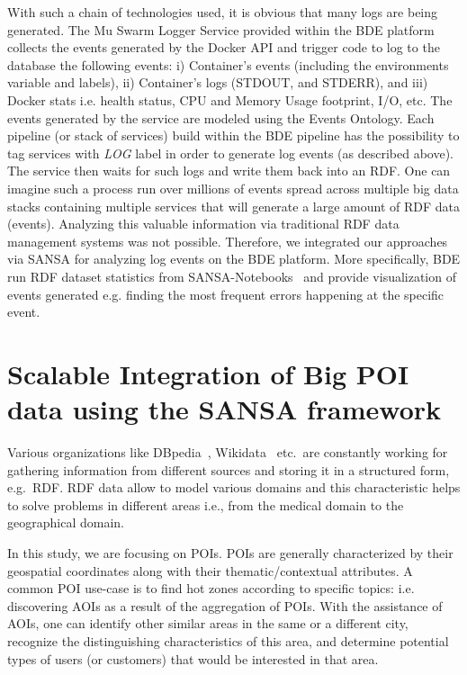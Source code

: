 With such a chain of technologies used, it is obvious that many logs are being generated.
The Mu Swarm Logger Service provided within the BDE platform collects the events generated by the Docker \gls{API} and trigger code to log to the database the following events: i) Container's events (including the environments variable and labels), ii) Container's logs (STDOUT, and STDERR), and iii) Docker stats i.e. health status, CPU and Memory Usage footprint, I/O, etc.
The events generated by the service are modeled using the Events Ontology.
Each pipeline (or stack of services) build within the BDE pipeline has the possibility to tag services with \textit{LOG} label in order to generate log events (as described above).
The service then waits for such logs and write them back into an \gls{RDF}.
One can imagine such a process run over millions of events spread across multiple big data stacks containing multiple services that will generate a large amount of \gls{RDF} data (events).
Analyzing this valuable information via traditional \gls{RDF} data management systems was not possible.
Therefore, we integrated our approaches via SANSA for analyzing log events on the BDE platform.
More specifically, BDE run \gls{RDF} dataset statistics from SANSA-Notebooks~\cite{iermilov-2017-sansa-iswc-demo} and provide visualization of events generated e.g. finding the most frequent errors happening at the specific event.

\section{Scalable Integration of Big POI data using the SANSA framework}
\label{sec:slipo-use-case}

Various organizations like DBpedia~\cite{dbpedia-swj}, Wikidata~\cite{Vrandecic:2014:WFC:2661061.2629489} etc.\ are constantly working for gathering information from different sources and storing it in a structured form, e.g.~\gls{RDF}.
\gls{RDF} data allow to model various domains and this characteristic helps to solve problems in different areas i.e., from the medical domain to the geographical domain. 

In this study, we are focusing on \gls{POI}s.
\gls{POI}s are generally characterized by their geospatial coordinates along with their thematic/contextual attributes.
A common \gls{POI} use-case is to find hot zones according to specific topics: i.e. discovering \gls{AOI}s as a result of the aggregation of \gls{POI}s.
With the assistance of \gls{AOI}s, one can identify other similar areas in the same or a different city, recognize the distinguishing characteristics of this area, and determine potential types of users (or customers) that would be interested in that area.

